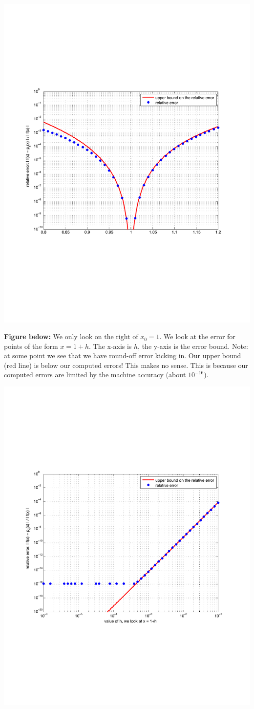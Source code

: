 \documentclass[pdftex,11pt]{article}
\begin{document}
\includegraphics[width=.7\textwidth]{EX_0_5_6_fig2}

\textbf{Figure below:} We only look on the right of $x_0=1$. We look at the
error for points of the form $x=1+h$.  The x-axis is $h$, the y-axis is the
error bound. Note: at some point we see that we have round-off error kicking
in.  Our upper bound (red line) is below our computed errors! This makes no
sense. This is because our computed errors are limited by the machine accuracy
(about $10^{-16}$).

\includegraphics[width=.7\textwidth]{EX_0_5_6_fig3}
\end{document}
